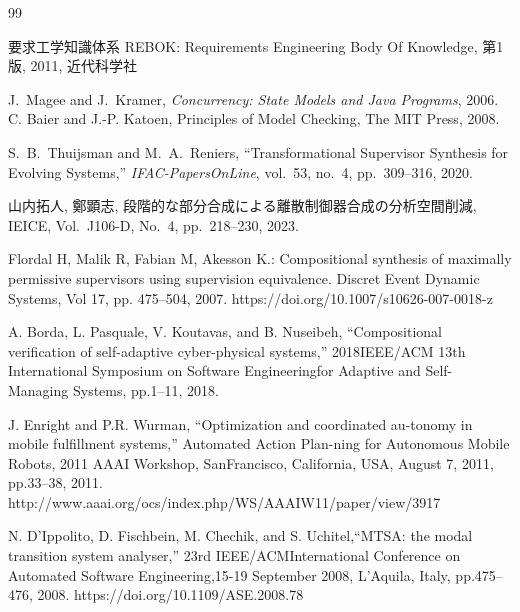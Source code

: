 \documentclass[technicalreport]{ieicej}
\begin{document}
\begin{thebibliography}{99} %
  {\footnotesize
  
  要求工学知識体系 REBOK: Requirements Engineering Body Of Knowledge, 第1版, 2011, 近代科学社
  
  J.~Magee and J.~Kramer, 
  {\it Concurrency: State Models and Java Programs}, 2006.
  C. Baier and J.-P. Katoen, Principles of Model Checking, The MIT Press, 2008.

  S.~B.~Thuijsman and M.~A.~Reniers, ``Transformational Supervisor Synthesis for Evolving Systems,'' {\it IFAC-PapersOnLine}, vol.~53, no.~4, pp.~309--316, 2020.
  
  山内拓人, 鄭顕志, 段階的な部分合成による離散制御器合成の分析空間削減, 
  IEICE, Vol.~J106-D, No.~4, pp.~218--230, 2023.

  Flordal H, Malik R, Fabian M, Akesson K.: Compositional synthesis of maximally permissive supervisors using supervision equivalence. Discret Event Dynamic Systems, Vol 17, pp. 475–504, 2007. https://doi.org/10.1007/s10626-007-0018-z

  A. Borda, L. Pasquale, V. Koutavas, and B. Nuseibeh, “Compositional verification of self-adaptive cyber-physical systems,” 2018IEEE/ACM 13th International Symposium on Software Engineeringfor Adaptive and Self-Managing Systems, pp.1–11, 2018.

  J. Enright and P.R. Wurman, “Optimization and coordinated au-tonomy in mobile fulfillment systems,” Automated Action Plan-ning for Autonomous Mobile Robots, 2011 AAAI Workshop, SanFrancisco, California, USA, August 7, 2011, pp.33–38, 2011.
  http://www.aaai.org/ocs/index.php/WS/AAAIW11/paper/view/3917

  N. D’Ippolito, D. Fischbein, M. Chechik, and S. Uchitel,“MTSA: the modal transition system analyser,” 23rd IEEE/ACMInternational Conference on Automated Software Engineering,15-19 September 2008, L’Aquila, Italy, pp.475–476, 2008.
  https://doi.org/10.1109/ASE.2008.78
  
  }
  \end{thebibliography} %
\end{document}
